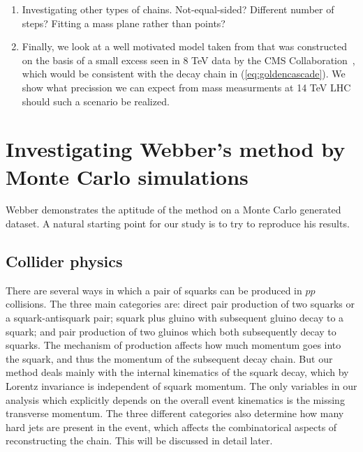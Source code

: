 \documentclass[twoside,english]{uiofysmaster}
\begin{document}
\begin{enumerate}
	\item Investigating other types of chains. Not-equal-sided? Different number of steps? Fitting a mass plane rather than points?
	\item Finally, we look at a well motivated model taken from \cite{Allanach:2014gsa} that was constructed on the basis of a small excess seen in 8 TeV data by the CMS Collaboration~\cite{CMS:2014jfa}, which would be consistent with the decay chain in (\ref{eq:goldencascade}). We show what precission we can expect from mass measurments at 14 TeV LHC should such a scenario be realized.
\end{enumerate}






























\chapter{Investigating Webber's method by Monte Carlo simulations}
\label{ch:MC}
Webber demonstrates the aptitude of the method on a Monte Carlo generated dataset. A natural starting point for our study is to try to reproduce his results. 

\section{Collider physics}
There are several ways in which a pair of squarks can be produced in $pp$ collisions. The three main categories are: direct pair production of two squarks or a squark-antisquark pair; squark plus gluino with subsequent gluino decay to a squark; and pair production of two gluinos which both subsequently decay to squarks. The mechanism of production affects how much momentum goes into the squark, and thus the momentum of the subsequent decay chain. But our method deals mainly with the internal kinematics of the squark decay, which by Lorentz invariance is independent of squark momentum. The only variables in our analysis which explicitly depends on the overall event kinematics is the missing transverse momentum. The three different categories also determine how many hard jets are present in the event, which affects the combinatorical aspects of reconstructing the chain. This will be discussed in detail later.
\end{document}
